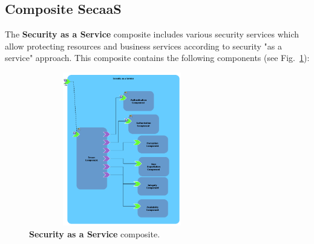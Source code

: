 \documentclass[runningheads,a4paper]{llncs}
\begin{document}
\subsection{Composite SecaaS}

The \textbf{Security as a Service} composite includes various security services which allow protecting resources and business services according to security "as a service" approach. This composite contains the following components (see Fig.~\ref{fig:SecaaS}):
\begin{figure}[ht]  
\centering
\includegraphics[height=190pt, width=230pt]{Secaas1.PNG}
\caption{\textbf{Security as a Service} composite.}
\label{fig:SecaaS}
\end{figure}
\end{document}
